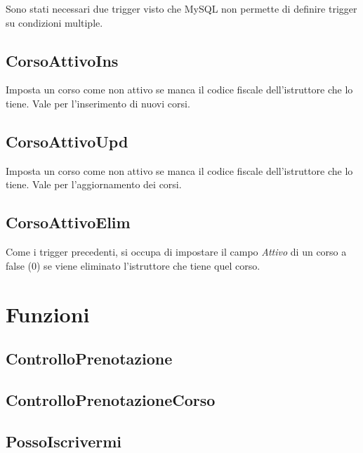 Sono stati necessari due trigger visto che MySQL non permette di definire trigger su condizioni multiple.

\subsection{CorsoAttivoIns}


Imposta un corso come non attivo se manca il codice fiscale dell'istruttore che lo tiene. Vale per l'inserimento di nuovi corsi.

\subsection{CorsoAttivoUpd}



Imposta un corso come non attivo se manca il codice fiscale dell'istruttore che lo tiene. Vale per l'aggiornamento dei corsi.

\subsection{CorsoAttivoElim}



Come i trigger precedenti, si occupa di impostare il campo \textit{Attivo} di un corso a false (0) se viene eliminato l'istruttore che tiene quel corso.

\section{Funzioni}

\subsection{ControlloPrenotazione}



\subsection{ControlloPrenotazioneCorso}



\subsection{PossoIscrivermi}

